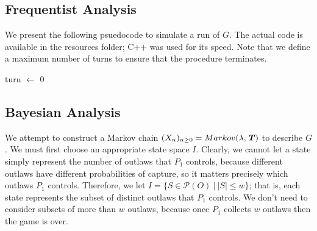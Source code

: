\documentclass{article}
\newcommand{\T}{\textbf{\textit{T}}}
\theoremstyle{definition}
\theoremstyle{plain}
\begin{document}
	\subsection{Frequentist Analysis}
	We present the following psuedocode to simulate a run of $G$. The actual code is available in the resources folder; C++ was used for its speed. Note that we define a maximum number of turns to ensure that the procedure terminates.
	\begin{algorithm}

	turn $\gets$ 0\\
	\end{algorithm}

	\subsection{Bayesian Analysis}
We attempt to construct a Markov chain $(X_n)_{n \geq 0} = Markov(\lambda, \T)$ to describe $G$. We must first choose an appropriate state space $I$. Clearly, we cannot let a state simply represent the number of outlaws that $P_1$ controls, because different outlaws have different probabilities of capture, so it matters precisely which outlaws $P_1$ controls.  Therefore, we let $I = \{S \in \mathcal{P}(O) ~\big|~ |S| \leq w\}$; that is, each state represents the subset of distinct outlaws that $P_1$ controls. We don't need to consider subsets of more than $w$ outlaws, because once $P_1$ collects $w$ outlaws then the game is over.
\end{document}

